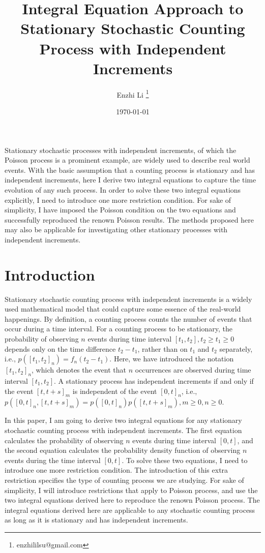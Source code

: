 \documentclass[10pt]{article}
\author{Enzhi Li  \thanks{enzhililsu@gmail.com}}
\affil{Suning R \& D Center, Palo Alto, USA}
\title{Integral Equation Approach to Stationary Stochastic Counting Process with Independent Increments}
\date{\today}
\numberwithin{figure}{section}
\numberwithin{equation}{section}
\begin{document}
\maketitle

Stationary stochastic processes with independent increments, of which the Poisson process is a prominent example, are widely used to describe real world events. With the basic assumption that a counting process is stationary and has independent increments, here I derive two integral equations to capture the time evolution of any such process. In order to solve these two integral equations explicitly, I need to introduce one more restriction condition. For sake of simplicity, I have imposed the Poisson condition on the two equations and successfully reproduced the renown Poisson results. The methods proposed here may also be applicable for investigating other stationary processes with independent increments. 
\vskip0.3cm


\section{Introduction}
Stationary stochastic counting process with independent increments is a widely used mathematical model that could capture some essence of the real-world happenings\cite{ross1996stochastic}. By definition, a counting process counts the number of events that occur during a time interval. For a counting process to be stationary, the probability of observing $n$ events during time interval $[t_1, t_2], t_2 \ge t_1 \ge 0$ depends only on the time difference $t_2 - t_1$, rather than on $t_1$ and $t_2$ separately, i.e., $p([t_1, t_2]_{n}) = f_{n}(t_2 - t_1)$. Here, we have introduced the notation $[t_1, t_2]_{n}$, which denotes the event that $n$ occurrences are observed during time interval $[t_1, t_2]$. A stationary process has independent increments if and only if the event $[t ,t + s]_{m}$ is independent of the event $[0, t]_{n}$, i.e., $p([0, t]_{n}, [t, t+s]_{m}) = p([0, t]_{n}) p([t, t+s]_{m}), m \ge 0, n \ge 0$. 

In this paper, I am going to derive two integral equations for any stationary stochastic counting process with independent increments. The first equation calculates the probability of observing $n$ events during time interval $[0, t]$, and the second equation calculates the probability density function of observing $n$ events during the time interval $[0, t]$. To solve these two equations, I need to introduce one more restriction condition. The introduction of this extra restriction specifies the type of counting process we are studying. For sake of simplicity, I will introduce restrictions that apply to Poisson process, and use the two integral equations derived here to reproduce the renown Poisson process\cite{ross1996stochastic}. The integral equations derived here are applicable to any stochastic counting process as long as it is stationary and has independent increments.
\end{document}

